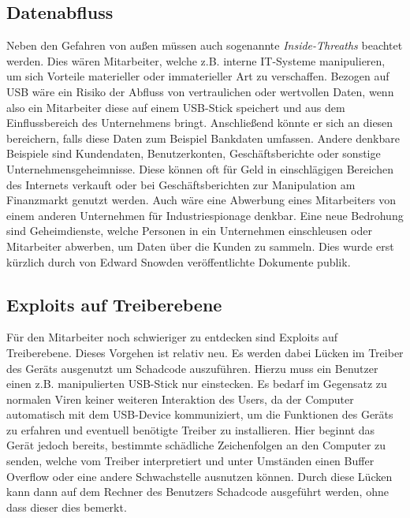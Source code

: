 \subsection{Datenabfluss}
Neben den Gefahren von außen müssen auch sogenannte \textit{Inside-Threaths} beachtet werden. Dies wären Mitarbeiter, welche z.B. interne IT-Systeme manipulieren, um sich Vorteile materieller oder immaterieller Art zu verschaffen. Bezogen auf USB wäre ein Risiko der Abfluss von vertraulichen oder wertvollen Daten, wenn also ein Mitarbeiter diese auf einem USB-Stick speichert und aus dem Einflussbereich des Unternehmens bringt. Anschließend könnte er sich an diesen bereichern, falls diese Daten zum Beispiel Bankdaten umfassen. Andere denkbare Beispiele sind Kundendaten, Benutzerkonten, Geschäftsberichte oder sonstige Unternehmensgeheimnisse. Diese können oft für Geld in einschlägigen Bereichen des Internets verkauft oder bei Geschäftsberichten zur Manipulation am Finanzmarkt genutzt werden. Auch wäre eine Abwerbung eines Mitarbeiters von einem anderen Unternehmen für Industriespionage denkbar.
Eine neue Bedrohung sind Geheimdienste, welche Personen in ein Unternehmen einschleusen oder Mitarbeiter abwerben, um Daten über die Kunden zu sammeln. Dies wurde erst kürzlich durch von Edward Snowden veröffentlichte Dokumente publik.\cite{Snowden2}

\subsection{Exploits auf Treiberebene}
Für den Mitarbeiter noch schwieriger zu entdecken sind Exploits auf Treiberebene. Dieses Vorgehen ist relativ neu. Es werden dabei Lücken im Treiber des Geräts ausgenutzt um Schadcode auszuführen. Hierzu muss ein Benutzer einen z.B. manipulierten USB-Stick nur einstecken. Es bedarf im Gegensatz zu normalen Viren keiner weiteren Interaktion des Users, da der Computer automatisch mit dem USB-Device kommuniziert, um die Funktionen des Geräts zu erfahren und eventuell benötigte Treiber zu installieren. Hier beginnt das Gerät jedoch bereits, bestimmte schädliche Zeichenfolgen an den  Computer zu senden, welche vom Treiber interpretiert und unter Umständen einen Buffer Overflow  oder eine andere Schwachstelle ausnutzen können\cite{BadUSB}. Durch diese Lücken kann dann auf dem Rechner des Benutzers Schadcode ausgeführt werden, ohne dass dieser dies bemerkt.


